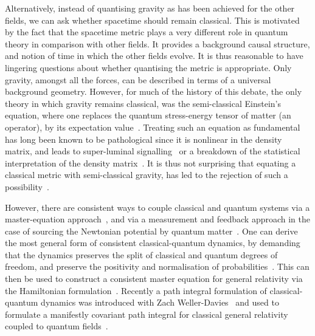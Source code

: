 \documentclass[aps,preprintnumbers,superscriptaddress,longbibliography]{revtex4-1}
\begin{document}
Alternatively, instead of quantising gravity as has been achieved for the other fields, we can ask whether spacetime should remain classical.
This is motivated by the fact that the spacetime metric plays a very different role in quantum theory in comparison with other fields. It provides a background causal structure, and notion of time in which the other fields evolve. It is thus reasonable to have lingering questions about whether quantising the metric is appropriate. Only gravity, amongst all the forces, can be described in terms of a universal background geometry. However, for much of the history of this debate, the only theory in which gravity remains classical, was the semi-classical Einstein's equation, where
one replaces the quantum stress-energy tensor of matter (an operator), by its expectation value~\cite{sato1950attempt,moller1962theories,rosenfeld1963quantization}. Treating such an equation as fundamental has long been known to be pathological since it is nonlinear in the density matrix, and leads to super-luminal signalling~\cite{gisin1989stochastic,gisin1990weinberg,polchinski1991weinberg} or a breakdown of the statistical interpretation of the density matrix~\cite{page1981indirect}. It is thus not surprising that equating a classical metric with semi-classical gravity, has led to the rejection of such a possibility~\cite{dewitt1953new,duff1980inconsistency,unruh1984steps,carlip2008quantum}.

However, there are consistent ways to couple classical and quantum systems via a master-equation approach~\cite{blanchard1993interaction,blanchard1995event,diosi1995quantum,poulinKITP,oppenheim2018post,UCLPawula}, and via a measurement and feedback approach in the case of sourcing the Newtonian potential by quantum matter~\cite{kafri2014classical,tilloy2016sourcing,tilloy2017principle}. One can derive the most general form of consistent classical-quantum dynamics, by
demanding that the dynamics preserves the split of classical and quantum degrees of freedom, and preserve the positivity and normalisation of probabilities~\cite{oppenheim2018post,UCLPawula}. This can then be used to construct a consistent master equation for general relativity via the Hamiltonian formulation~\cite{oppenheim2018post,oppenheim2021constraints}. Recently a path integral formulation of classical-quantum dynamics was introduced with Zach Weller-Davies~\cite{oppenheim2023path} and used to formulate a manifestly covariant path integral for classical general relativity coupled to quantum fields~\cite{oppenheim2023covariant}.
\end{document}
